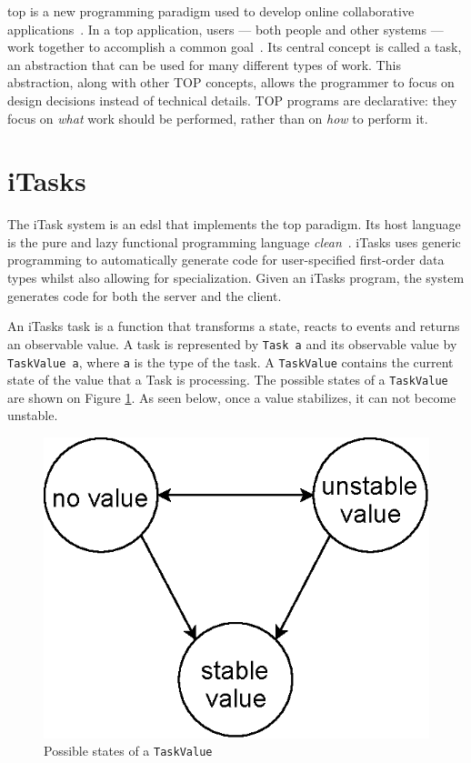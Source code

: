\acf{top} is a new programming paradigm used to develop online collaborative applications~\cite{top}. In a \acs{top} application, users --- both people and other systems --- work together to accomplish a common goal~\cite{top}. Its central concept is called a task, an abstraction that can be used for many different types of work. This abstraction, along with other TOP concepts, allows the programmer to focus on design decisions instead of technical details. TOP programs are declarative: they focus on \textit{what} work should be performed, rather than on \textit{how} to perform it.

\section{\gls{iTasks}}\label{itasks}
The iTask system is an \acs{edsl} that implements the \acs{top} paradigm. Its host language is the pure and lazy functional programming language \textit{\gls{clean}}~\cite{clean}. \gls{iTasks} uses generic programming to automatically generate code for user-specified first-order data types whilst also allowing for specialization. Given an \gls{iTasks} program, the system generates code for both the server and the client.

An \gls{iTasks} task is a function that transforms a state, reacts to events and returns an observable value. A task is represented by \texttt{Task a} and its observable value by \texttt{TaskValue a}, where \texttt{a} is the type of the task. A \texttt{TaskValue} contains the current state of the value that a Task is processing. The possible states of a \texttt{TaskValue} are shown on Figure \ref{fig:task_value}. As seen below, once a value stabilizes, it can not become unstable.


\begin{figure}[H]
\begin{center}
\includegraphics[scale=0.7]{thesis/img/task_value.eps}
\end{center}
\caption{Possible states of a \texttt{TaskValue}}
\label{fig:task_value}
\end{figure}

